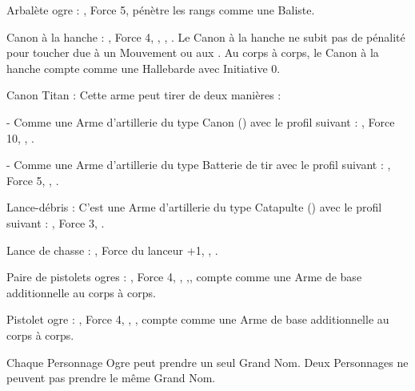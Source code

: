 \begin{customdescription}
	\item[Arbalète ogre :] , Force 5, pénètre les rangs comme une Baliste.
	\item[Canon à la hanche :], Force 4, \newrule{\cumbersome}, , . Le Canon à la hanche ne subit pas de pénalité pour toucher due à un Mouvement ou aux \multipleshots{}. Au corps à corps, le Canon à la hanche compte comme une Hallebarde avec Initiative 0.
	\item[Canon Titan :] Cette arme peut tirer de deux manières :
		\begin{customsubitemize}
			\item[-] Comme une Arme d'artillerie du type Canon () avec le profil suivant : , Force 10, \multiplewounds{\ordnance}{}, .
			\item[-] Comme une Arme d'artillerie du type Batterie de tir avec le profil suivant : , Force 5, , .
		\end{customsubitemize}
	\item[Lance-débris :] C'est une Arme d'artillerie du type Catapulte () avec le profil suivant : , Force 3,  .
	\item[Lance de chasse :] , Force du lanceur +1, , \quicktofire .	
	\item[Paire de pistolets ogres :] , Force 4, , ,\quicktofire, compte comme une Arme de base additionnelle au corps à corps.
	\item[Pistolet ogre :] , Force 4, , \quicktofire,  compte comme une Arme de base additionnelle au corps à corps.
\end{customdescription}


Chaque Personnage Ogre peut prendre un seul Grand Nom. Deux Personnages ne peuvent pas prendre le même Grand Nom.


